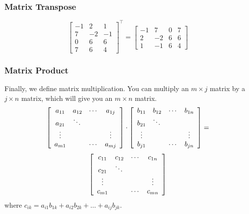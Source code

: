 \documentclass[xcolor=dvipsnames]{beamer}
\begin{document}
\begin{frame}
  \frametitle{Matrix Transpose}
  \begin{equation}
    \label{eq:ujaesuch}
    \left[
      \begin{array}{ccc}
        -1 & 2 & 1 \\
        7 & -2 & -1 \\
        0 & 6 & 6 \\
        7 & 6 & 4
      \end{array}\right]^{\intercal}=\left[
      \begin{array}{cccc}
        -1 & 7 & 0 & 7 \\
        2 & -2 & 6 & 6 \\
        1 & -1 & 6 & 4
      \end{array}\right]
  \end{equation}
\end{frame}

\begin{frame}
  \frametitle{Matrix Product}
Finally, we define \alert{matrix multiplication}. You can multiply an
$m\times{}j$ matrix by a $j\times{}n$ matrix, which will give you an
$m\times{}n$ matrix.
\begin{equation}
  \label{eq:orahpahn}
  \left[\begin{array}{cccc}
    a_{11}&a_{12}&\cdots{}&a_{1j} \\
          a_{21}&\ddots{}&& \\
          \vdots{}&&&\vdots \\
          a_{m1}&&\cdots{}&a_{mj}
  \end{array}\right]\cdot
\left[\begin{array}{cccc}
    b_{11}&b_{12}&\cdots{}&b_{1n} \\
          b_{21}&\ddots{}&& \\
          \vdots{}&&&\vdots \\
          b_{j1}&&\cdots{}&b_{jn}
  \end{array}\right]=\notag
\end{equation}
\begin{equation}
  \label{eq:raipuboi}
  \left[\begin{array}{cccc}
    c_{11}&c_{12}&\cdots{}&c_{1n} \\
          c_{21}&\ddots{}&& \\
          \vdots{}&&&\vdots \\
          c_{m1}&&\cdots{}&c_{mn}
  \end{array}\right]\notag
\end{equation}
where $c_{ik}=a_{i1}b_{1k}+a_{i2}b_{2k}+\ldots+a_{ij}b_{jk}$.
\end{frame}
\end{document}
